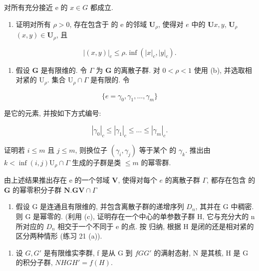 对所有充分接近 e 的 \(x \in G\) 都成立.

\begin{enumerate}
\def\labelenumi{(\alph{enumi})}
\setcounter{enumi}{1}
\tightlist
\item
  证明对所有 \(\rho > 0\), 存在包含于  的 e 的邻域 \(\mathbf{U}_{\rho}\), 使得对 \(e\) 中的 \(\mathbf{U}\)\(x, y\), \(\mathbf{U}_{\rho}\)\((x, y) \in \mathbf{U}_{\rho}\), 且
\end{enumerate}

\[
\left| (x, y) \right| _ {c} \leqslant \rho . \inf (\left| x \right| _ {c}, \left| y \right| _ {c}).
\]

\begin{enumerate}
\def\labelenumi{(\alph{enumi})}
\setcounter{enumi}{2}
\tightlist
\item
  假设 \(\mathbf{G}\) 是有限维的. 令 \(\Gamma\) 为 \(\mathbf{G}\) 的离散子群. 对 \(0 < \rho < 1\) 使用 (b), 并选取相对紧的 \(\mathrm{U}_{\rho}\). 集合 \(\mathrm{U}_{\rho} \cap \Gamma\) 是有限的. 令
\end{enumerate}

\[
\{e = \gamma_ {0}, \gamma_ {1}, \dots , \gamma_ {m} \}
\]

是它的元素, 并按如下方式编号:

\[
\left| \gamma_ {0} \right| _ {c} \leqslant \left| \gamma_ {1} \right| _ {c} \leqslant \dots \leqslant \left| \gamma_ {m} \right| _ {c}.
\]

证明若 \(i \leqslant m\) 且 \(j \leqslant m\), 则换位子 \((\gamma_{i}, \gamma_{j})\) 等于某个  的 \(\gamma_{k}\). 推出由 \(k < \inf(i,j)\)\(\mathrm{U}_{\rho} \cap \Gamma\) 生成的子群是类 \(\leqslant m\) 的幂零群.

由上述结果推出存在 e 的一个邻域 \(\mathbf{V}\), 使得对每个 \(e\) 的离散子群 \(\Gamma\), 都存在包含  的 \(\mathbf{G}\) 的幂零积分子群 \(\mathbf{N}\).\(\mathbf{G}\)\(\mathbf{V} \cap \Gamma\)

\begin{enumerate}
\def\labelenumi{(\alph{enumi})}
\setcounter{enumi}{3}
\tightlist
\item
  假设 G 是连通且有限维的, 并包含离散子群的递增序列 \(D_{n}\), 其并在 G 中稠密. 则 G 是幂零的. (利用 (c), 证明存在一个中心的单参数子群 H, 它与充分大的 n 所对应的 \(D_{n}\) 相交于一个不同于 e 的点. 按  归纳, 根据 H 是闭的还是相对紧的区分两种情形 (练习 21 (a)).
\end{enumerate}

\begin{enumerate}
\def\labelenumi{\arabic{enumi}.}
\setcounter{enumi}{23}
\tightlist
\item
  设 \(G, G'\) 是有限维实李群, f 是从 G 到 \(f\)\(G\)\(G'\) 的满射态射, N 是其核, H 是 G 的积分子群, \(N\)\(H\)\(G\)\(H' = f(H)\).
\end{enumerate}

